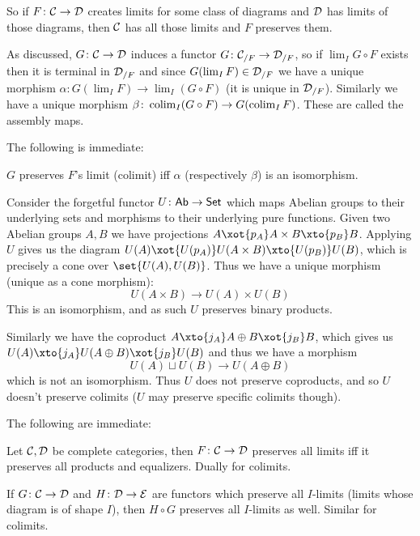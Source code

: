 \edefn

So if $F\colon{{\cal C}}\to{{\cal D}}$ creates limits for some class of diagrams and ${{\cal D}}$ has limits of those diagrams, then ${{\cal C}}$ has all those limits and $F$ preserves them.

As discussed, $G\colon{{\cal C}}\to{{\cal D}}$ induces a functor $G\colon{{\cal C}}_{/F}\to{{\cal D}}_{/F}$, so if $\lim_IG\circ F$ exists then it is terminal in ${{\cal D}}_{/F}$ and since $G(\mathop{\rm lim}\nolimits_IF)\in{{\cal D}}_{/F}$ we have
a unique morphism $\alpha\colon G(\lim_IF)\to\lim_I(G\circ F)$ (it is unique in ${{\cal D}}_{/F}$).
Similarly we have a unique morphism $\beta\colon\mathop{\rm colim}\nolimits_I(G\circ F)\to G(\mathop{\rm colim}\nolimits_IF)$.
These are called the {\emphcolor assembly maps}.

The following is immediate:

\bprop

    $G$ preserves $F$'s limit (colimit) iff $\alpha$ (respectively $\beta$) is an isomorphism.

\eprop

\bexam

    Consider the {\emphcolor forgetful functor} $U\colon{\sf Ab}\to{\sf Set}$ which maps Abelian groups to their underlying sets and morphisms to their underlying pure functions.
    Given two Abelian groups $A,B$ we have projections $A\xot{p_A}A\times B\xto{p_B}B$.
    Applying $U$ gives us the diagram $U(A)\xot{U(p_A)}U(A\times B)\xto{U(p_B)}U(B)$, which is precisely a cone over $\set{U(A),U(B)}$.
    Thus we have a unique morphism (unique as a cone morphism):
    $$ U(A\times B) \to U(A)\times U(B) $$
    This is an isomorphism, and as such $U$ preserves binary products.

    Similarly we have the coproduct $A\xto{j_A}A\oplus B\xot{j_B}B$, which gives us $U(A)\xto{j_A}U(A\oplus B)\xot{j_B}U(B)$ and thus we have a morphism
    $$ U(A)\sqcup U(B) \to U(A\oplus B) $$
    which is not an isomorphism.
    Thus $U$ does not preserve coproducts, and so $U$ doesn't preserve colimits ($U$ may preserve specific colimits though).

\eexam

The following are immediate:

\bprop

    Let ${{\cal C}},{{\cal D}}$ be complete categories, then $F\colon{{\cal C}}\to{{\cal D}}$ preserves all limits iff it preserves all products and equalizers.
    Dually for colimits.

\eprop

\blemm

    If $G\colon{{\cal C}}\to{{\cal D}}$ and $H\colon{{\cal D}}\to{{\cal E}}$ are functors which preserve all $I$-limits (limits whose diagram is of shape $I$), then $H\circ G$ preserves all $I$-limits as well.
    Similar for colimits.

